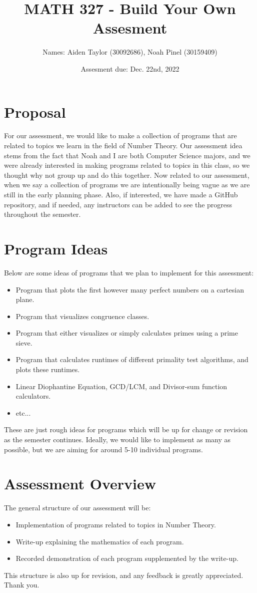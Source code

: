 \documentclass[11pt]{article}
\title{MATH 327 - Build Your Own Assesment}
\author{Names: Aiden Taylor (30092686), Noah Pinel (30159409)}
\date{Assesment due: Dec. 22nd, 2022}
\begin{document}
\maketitle
\newpage
\section*{Proposal}
For our assessment, we would like to make a collection of programs that are related to topics we learn in the field of Number Theory.
Our assessment idea stems from the fact that Noah and I are both Computer Science majors, and we were already interested in making programs related to topics in this class, so we thought why not group up and do this together.
Now related to our assessment, when we say a collection of programs we are intentionally being vague as we are still in the early planning phase.
Also, if interested, we have made a GitHub repository, and if needed, any instructors can be added to see the progress throughout the semester.
\section*{Program Ideas}
Below are some ideas of programs that we plan to implement for this assessment:
\begin{itemize}
\item Program that plots the first however many perfect numbers on a cartesian plane.
\item Program that visualizes congruence classes.
\item Program that either visualizes or simply calculates primes using a prime sieve.
\item Program that calculates runtimes of different primality test algorithms, and plots these runtimes.
\item Linear Diophantine Equation, GCD/LCM, and Divisor-sum function calculators.
\item etc...
\end{itemize}
These are just rough ideas for programs which will be up for change or revision as the semester continues.
Ideally, we would like to implement as many as possible, but we are aiming for around 5-10 individual programs.
\section*{Assessment Overview}
The general structure of our assessment will be:
\begin{itemize}
\item Implementation of programs related to topics in Number Theory.
\item Write-up explaining the mathematics of each program.
\item Recorded demonstration of each program supplemented by the write-up.
\end{itemize}
This structure is also up for revision, and any feedback is greatly appreciated. Thank you.
\end{document}
